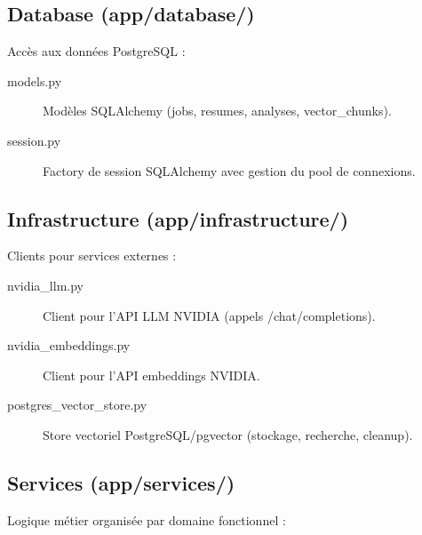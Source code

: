 \documentclass[12pt,a4paper,oneside]{book}
\begin{document}
\subsection{Database (app/database/)}

Accès aux données PostgreSQL :

\begin{description}
    \item[models.py] Modèles SQLAlchemy (jobs, resumes, analyses, vector\_chunks).
    
    \item[session.py] Factory de session SQLAlchemy avec gestion du pool de connexions.
\end{description}

\subsection{Infrastructure (app/infrastructure/)}

Clients pour services externes :

\begin{description}
    \item[nvidia\_llm.py] Client pour l'API LLM NVIDIA (appels /chat/completions).
    
    \item[nvidia\_embeddings.py] Client pour l'API embeddings NVIDIA.
    
    \item[postgres\_vector\_store.py] Store vectoriel PostgreSQL/pgvector (stockage, recherche, cleanup).
\end{description}

\subsection{Services (app/services/)}

Logique métier organisée par domaine fonctionnel :
\end{document}
